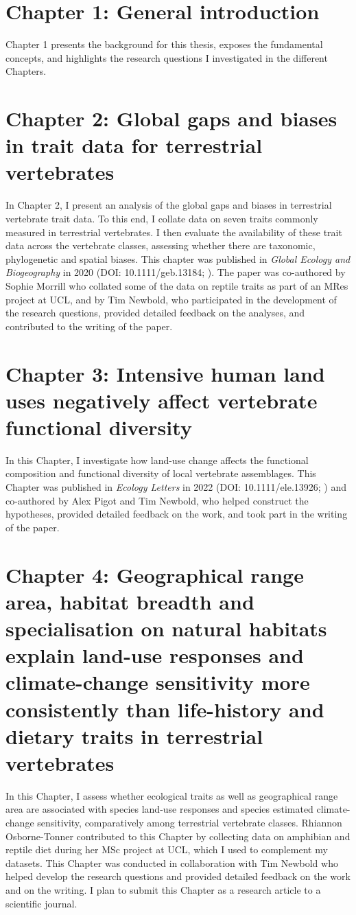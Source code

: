 
\section*{Chapter 1: General introduction}
Chapter 1 presents the background for this thesis, exposes the fundamental concepts, and highlights the research questions I investigated in the different Chapters.

\section*{Chapter 2: Global gaps and biases in trait data for terrestrial vertebrates}
In Chapter 2, I present an analysis of the global gaps and biases in terrestrial vertebrate trait data. To this end, I collate data on seven traits commonly measured in terrestrial vertebrates. I then evaluate the availability of these trait data across the vertebrate classes, assessing whether there are taxonomic, phylogenetic and spatial biases. This chapter was published in \textit{Global Ecology and Biogeography} in 2020 (DOI: 10.1111/geb.13184; \citet{Etard2020}). The paper was co-authored by Sophie Morrill who collated some of the data on reptile traits as part of an MRes project at UCL, and by Tim Newbold, who participated in the development of the research questions, provided detailed feedback on the analyses, and contributed to the writing of the paper. 

\section*{Chapter 3: Intensive human land uses negatively affect vertebrate functional diversity}
In this Chapter, I investigate how land-use change affects the functional composition and functional diversity  of local vertebrate assemblages. This Chapter was published in \textit{Ecology Letters} in 2022  (DOI: 10.1111/ele.13926; \citet{Etard2022}) and co-authored by Alex Pigot and Tim Newbold, who helped construct the hypotheses, provided detailed feedback on the work, and took part in the writing of the paper.

\section*{Chapter 4: Geographical range area, habitat breadth and specialisation on natural habitats explain land-use responses and climate-change sensitivity more consistently than life-history and dietary traits in terrestrial vertebrates}
In this Chapter, I assess whether ecological traits as well as geographical range area are associated with species land-use responses and species estimated climate-change sensitivity, comparatively among terrestrial vertebrate classes. Rhiannon Osborne-Tonner contributed to this Chapter by collecting data on amphibian and reptile diet during her MSc project at UCL, which I used to complement my datasets. This Chapter was conducted in collaboration with Tim Newbold who helped develop the research questions and provided detailed feedback on the work and on the writing.  I plan to submit this Chapter as a research article to a scientific journal.

